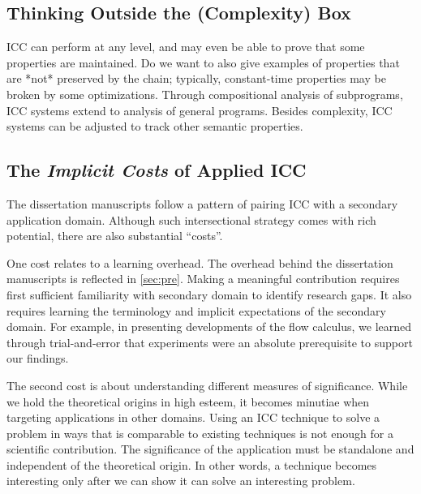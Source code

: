 \subsection{Thinking Outside the (Complexity) Box}
\label{subsec:res-other-props}

ICC can perform at any level, and may even be able to prove that some properties are maintained.
Do we want to also give examples of properties that are *not* preserved by the chain;
typically, constant-time properties may be broken by some optimizations.
Through compositional analysis of subprograms, ICC systems extend to analysis of general programs.
Besides complexity, ICC systems can be adjusted to track other semantic properties.

\subsection{The \emph{Implicit Costs} of Applied ICC}
\label{subsec:res-meta}

The dissertation manuscripts follow a pattern of pairing ICC with a secondary application domain.
Although such intersectional strategy comes with rich potential, there are also substantial \enquote{costs}.

One cost relates to a learning overhead.
The overhead behind the dissertation manuscripts is reflected in \autoref{sec:pre}.
Making a meaningful contribution requires first sufficient familiarity with secondary domain to identify research gaps.
It also requires learning the terminology and implicit expectations of the secondary domain.
For example, in presenting developments of the flow calculus, we learned through trial-and-error that experiments were an absolute prerequisite to support our findings.

The second cost is about understanding different measures of significance.
While we hold the theoretical origins in high esteem, it becomes minutiae when targeting applications in other domains.
Using an ICC technique to solve a problem in ways that is comparable to existing techniques is not enough for a scientific contribution.
The significance of the application must be standalone and independent of the theoretical origin.
In other words, a technique becomes interesting only after we can show it can solve an interesting problem.

